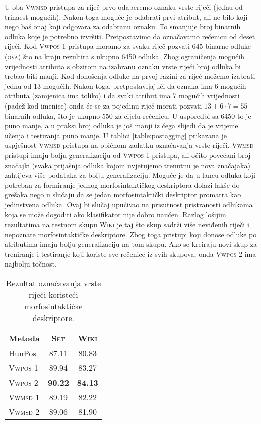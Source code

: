 U oba \textsc{Vwmsd} pristupa za riječ prvo odaberemo oznaku vrste riječi (jednu
od trinaest mogućih). Nakon toga moguće je odabrati prvi atribut, ali ne bilo
koji nego baš onaj koji odgovara za odabranu oznaku. To smanjuje broj binarnih
odluka koje je potrebno izvršiti. Pretpostavimo da označavamo rečenicu od deset
riječi. Kod \textsc{Vwpos 1} pristupa moramo za svaku riječ pozvati 645 binarne
odluke (\textsc{ova}) što na kraju rezultira s ukupno 6450 odluka. Zbog
ograničenja mogućih vrijednosti atributa s obzirom na izabranu oznaku vrste
riječi broj odluka bi trebao biti manji. Kod donošenja odluke na prvoj razini za
riječ možemo izabrati jednu od 13 mogućih. Nakon toga, pretpostavljajući da
oznaka ima 6 mogućih atributa (zamjenica ima toliko) i da svaki atribut ima 7
mogućih vrijednosti (padež kod imenice) onda će se za pojedinu riječ morati
pozvati $13+6 \cdot 7 = 55$ binarnih odluka, što je ukupno 550 za cijelu
rečenicu. U usporedbi sa 6450 to je puno manje, a u praksi broj odluka je još
manji iz čega slijedi da je vrijeme učenja i testiranja puno manje. U tablici
\ref{table:postagging} prikazana je uspješnost \textsc{Vwmsd} pristupa na
običnom zadatku označavanja vrste riječi. \textsc{Vwmsd} pristupi imaju bolju
generalizaciju od \textsc{Vwpos 1} pristupa, ali očito povećani broj značajki
(svaka prijašnja odluka kojom uvjetujemo trenutnu je nova značajaka) zahtijeva
više podataka za bolju generalizaciju. Moguće je da u lancu odluka koji
potreban za formiranje jednog morfosintaktičkog deskriptora dolazi lakše do
grešaka nego u slučaju da se jedan morfosintaktički deskriptor promatra kao
jedinstvena odluka. Ovaj bi slučaj upućivao na prisutnost pristranosti odlukama
koja se može dogoditi ako klasifikator nije dobro naučen. Razlog lošijim
rezultatima na testnom skupu \textsc{Wiki} je taj što skup sadrži više neviđenih
riječi i nepoznate morfosintaktičke deskriptore. Zbog toga pristupi koji donose
odluke po atributima imaju bolju generalizaciju na tom skupu. Ako se kreiraju
novi skup za treniranje i testiranje koji koriste sve rečenice iz svih skupova,
onda \textsc{Vwpos 2} ima najbolju točnost.

\begin{table}
\centering
\caption{Rezultat označavanja vrste riječi koristeći morfosintaktičke
deskriptore.}
\label{table:msdtagging}
\begin{tabular}{|l|c|c|}
\hline
Metoda             & \textsc{Set}   & \textsc{Wiki}  \\ \hline \hline
HunPos             & 87.11          & 80.83          \\
\textsc{Vwpos 1}   & 89.94          & 83.27          \\
\textsc{Vwpos 2}   & \textbf{90.22} & \textbf{84.13} \\
\textsc{Vwmsd 1}   & 89.19          & 82.22          \\
\textsc{Vwmsd 2}   & 89.06          & 81.90          \\ \hline
\end{tabular}
\end{table}
